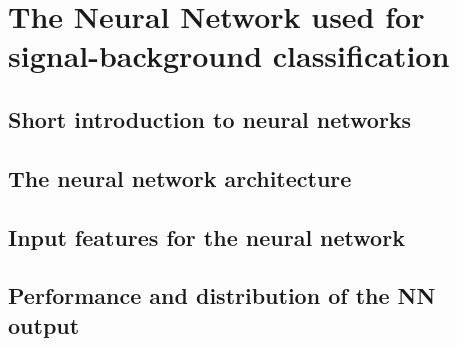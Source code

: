 \chapter{The Neural Network used for signal-background classification}
\section{Short introduction to neural networks}

\section{The neural network architecture}
\section{Input features for the neural network}
\section{Performance and distribution of the NN output}